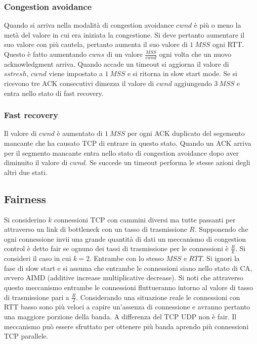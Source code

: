 \subsubsection{Congestion avoidance}
Quando si arriva nella modalit\`a di congestion avoidance $cwnd$ \`e pi\`u o meno la met\`a del valore in cui era iniziata la congestione. Si deve pertanto
aumentare il suo valore con pi\`u cautela, pertanto aumenta il suo valore di $1\ MSS$ ogni RTT. Questo \`e fatto aumentando $cwns$ di un valore $\frac{MSS}
{cwnd}$ ogni volta che un nuovo acknowledgment arriva. Quando accade un timeout si aggiorna il valore di $sstresh$, $cwnd$ viene impostato a $1\ MSS$ e si
ritorna in slow start mode. Se si ricevono tre ACK consecutivi dimezza il valore di $cwnd$ aggiungendo $3\ MSS$ e entra nello stato di fast recovery.
\subsubsection{Fast recovery}
Il valore di $cwnd$ \`e aumentato di $1\ MSS$ per ogni ACK duplicato del segemento mancante che ha causato TCP di entrare in questo stato. Quando un ACK 
arriva per il segmento mancante entra nello stato di congestion avoidance dopo aver diminuito il valore di $cwnd$. Se succede un timeout performa le stesse
azioni degli altri due stati.
\subsection{Fairness}
Si considerino $k$ connessioni TCP con cammini diversi ma tutte passanti per attraverso un link di bottleneck con un tasso di trasmissione $R$. Supponendo
che ogni connessione invii una grande quantit\`a di dati un meccanismo di congestion control \`e detto fair se ognuno dei tassi di trasmissione per le 
connessioni \`e $\frac{R}{k}$. Si consideri il caso in cui $k=2$. Entrambe con lo stesso $MSS$ e $RTT$. Si ignori la fase di slow start e si assuma che 
entrambe le connessioni siano nello stato di CA, ovvero AIMD (additive increase multiplicative decrease). Si noti che attraverso questo meccanismo entrambe
le connessioni fluttueranno intorno al valore di tasso di trasmissione pari a $\frac{R}{2}$. Considerando una situazione reale le connessioni con RTT basso
sono pi\`u veloci a capire un'assenza di connessione e avranno pertanto una maggiore porzione della banda. A differenza del TCP UDP non \`e fair. Il 
meccanismo pu\`o essere sfruttato per ottenere pi\`u banda aprendo pi\`u connessioni TCP parallele.
